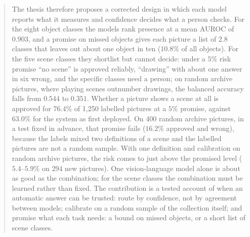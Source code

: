 \documentclass[12pt,a4paper]{report}
\begin{document}
\begin{abstract}
The thesis therefore proposes a corrected design in which each model reports what it measures and confidence decides what a person checks. For the eight object classes the models rank presence at a mean AUROC of $0.903$, and a promise on missed objects gives each picture a list of $2.8$ classes that leaves out about one object in ten ($10.8\%$ of all objects). For the five scene classes they shortlist but cannot decide: under a $5\%$ risk promise ``no scene'' is approved reliably, ``drawing'' with about one answer in six wrong, and the specific classes need a person; on random archive pictures, where playing scenes outnumber drawings, the balanced accuracy falls from $0.544$ to $0.351$. Whether a picture shows a scene at all is approved for $76.4\%$ of 1,250 labelled pictures at a $5\%$ promise, against $63.0\%$ for the system as first deployed. On 400 random archive pictures, in a test fixed in advance, that promise fails ($16.2\%$ approved and wrong), because the labels mixed two definitions of a scene and the labelled pictures are not a random sample. With one definition and calibration on random archive pictures, the risk comes to just above the promised level ($5.4$--$5.9\%$ on 294 new pictures). One vision-language model alone is about as good as the combination; for the scene classes the combination must be learned rather than fixed. The contribution is a tested account of when an automatic answer can be trusted: route by confidence, not by agreement between models; calibrate on a random sample of the collection itself; and promise what each task needs: a bound on missed objects, or a short list of scene classes.
\end{abstract}
\setcounter{page}{2}
\end{document}
